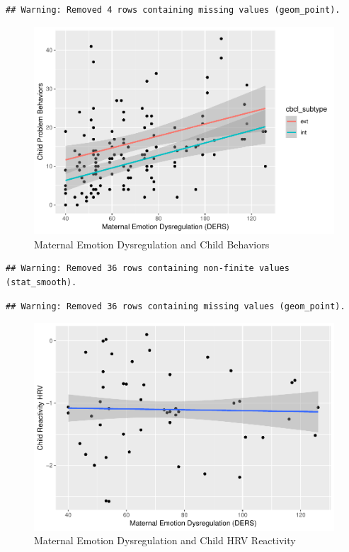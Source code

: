 \documentclass[man]{apa6}
\begin{document}
\begin{verbatim}
## Warning: Removed 4 rows containing missing values (geom_point).
\end{verbatim}

\begin{figure}
\centering
\includegraphics{DataPrepScript_apa_style_files/figure-latex/plot1-1.pdf}
\caption{\label{fig:plot1}Maternal Emotion Dysregulation and Child
Behaviors}
\end{figure}

\begin{verbatim}
## Warning: Removed 36 rows containing non-finite values (stat_smooth).
\end{verbatim}

\begin{verbatim}
## Warning: Removed 36 rows containing missing values (geom_point).
\end{verbatim}

\begin{figure}
\centering
\includegraphics{DataPrepScript_apa_style_files/figure-latex/plot2-1.pdf}
\caption{\label{fig:plot2}Maternal Emotion Dysregulation and Child HRV
Reactivity}
\end{figure}
\end{document}

